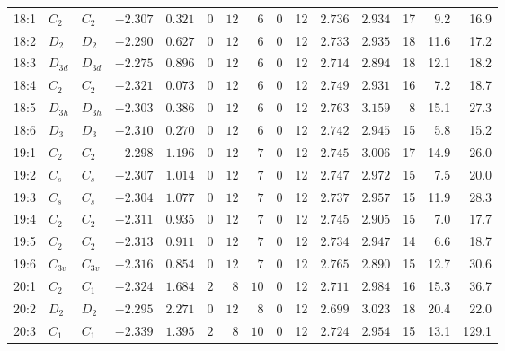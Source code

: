 \begin{table}[ht!]
\begin{tabular}{lllrrrrrrrrrrrr}
18:1    & $C_2$    & $C_{2 }$ & $-2.307$ & $0.321$  & $0$ & $12$ & $6$      & $0$ & 12 & $2.736$ & $2.934$ & 17  & 9.2  &  16.9    \\
18:2    & $D_2$    & $D_{2 }$ & $-2.290$ & $0.627$  & $0$ & $12$ & $6$      & $0$ & 12 & $2.733$ & $2.935$ & 18  & 11.6 &  17.2    \\
18:3    & $D_{3d}$ & $D_{3d}$ & $-2.275$ & $0.896$  & $0$ & $12$ & $6$      & $0$ & 12 & $2.714$ & $2.894$ & 18  & 12.1 &  18.2    \\
18:4    & $C_2$    & $C_{2 }$ & $-2.321$ & $0.073$  & $0$ & $12$ & $6$      & $0$ & 12 & $2.749$ & $2.931$ & 16  & 7.2  &  18.7    \\
18:5    & $D_{3h}$ & $D_{3h}$ & $-2.303$ & $0.386$  & $0$ & $12$ & $6$      & $0$ & 12 & $2.763$ & $3.159$ & 8   & 15.1 &  27.3    \\
18:6    & $D_3$    & $D_{3 }$ & $-2.310$ & $0.270$  & $0$ & $12$ & $6$      & $0$ & 12 & $2.742$ & $2.945$ & 15  & 5.8  &  15.2    \\
19:1    & $C_2$    & $C_{2 }$ & $-2.298$ & $1.196$  & $0$ & $12$ & $7$      & $0$ & 12 & $2.745$ & $3.006$ & 17  & 14.9 &  26.0    \\
19:2    & $C_s$    & $C_{s }$ & $-2.307$ & $1.014$  & $0$ & $12$ & $7$      & $0$ & 12 & $2.747$ & $2.972$ & 15  & 7.5  &  20.0    \\
19:3    & $C_s$    & $C_{s }$ & $-2.304$ & $1.077$  & $0$ & $12$ & $7$      & $0$ & 12 & $2.737$ & $2.957$ & 15  & 11.9 &  28.3    \\
19:4    & $C_2$    & $C_{2 }$ & $-2.311$ & $0.935$  & $0$ & $12$ & $7$      & $0$ & 12 & $2.745$ & $2.905$ & 15  & 7.0  &  17.7    \\
19:5    & $C_2$    & $C_{2 }$ & $-2.313$ & $0.911$  & $0$ & $12$ & $7$      & $0$ & 12 & $2.734$ & $2.947$ & 14  & 6.6  &  18.7    \\
19:6    & $C_{3v}$ & $C_{3v}$ & $-2.316$ & $0.854$  & $0$ & $12$ & $7$      & $0$ & 12 & $2.765$ & $2.890$ & 15  & 12.7 &  30.6    \\
20:1    & $C_2$    & $C_{1 }$ & $-2.324$ & $1.684$  & $2$ & $8$  & $10$     & $0$ & 12 & $2.711$ & $2.984$ & 16  & 15.3 &  36.7    \\
20:2    & $D_2$    & $D_{2 }$ & $-2.295$ & $2.271$  & $0$ & $12$ & $8$      & $0$ & 12 & $2.699$ & $3.023$ & 18  & 20.4 &  22.0    \\
20:3    & $C_1$    & $C_{1 }$ & $-2.339$ & $1.395$  & $2$ & $8$  & $10$     & $0$ & 12 & $2.724$ & $2.954$ & 15  & 13.1 &  129.1   \\

\end{tabular}
\end{table}
